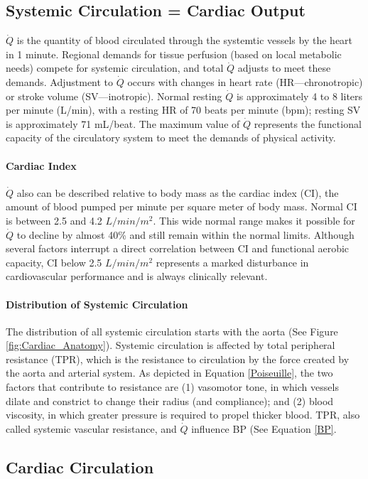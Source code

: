 \subsection{Systemic Circulation = Cardiac Output}
$\dot{Q}$ is the quantity of blood circulated through the systemtic vessels by the heart in 1 minute. Regional demands for tissue perfusion (based on local metabolic needs) compete for systemic circulation, and total $\dot{Q}$ adjusts to meet these demands. Adjustment to $\dot{Q}$ occurs with changes in heart rate (HR—chronotropic) or stroke volume (SV—inotropic). Normal resting $\dot{Q}$ is approximately 4 to 8 liters per minute (L/min), with a resting HR of 70 beats per minute (bpm); resting SV is approximately 71 mL/beat. The maximum value of $\dot{Q}$ represents the functional capacity of the circulatory system to meet the demands of physical activity.

\paragraph{Cardiac Index}
$\dot{Q}$ also can be described relative to body mass as the cardiac index (CI), the amount of blood pumped per minute per square meter of body mass. Normal CI is between 2.5 and 4.2 $L/min/m^2$. This wide normal range makes it possible for $\dot{Q}$ to decline by almost 40\% and still remain within the normal limits. Although several factors interrupt a direct correlation between CI and functional aerobic capacity,  CI below 2.5 $L/min/m^2$ represents a marked disturbance in cardiovascular performance and is always clinically relevant.

\paragraph{Distribution of Systemic Circulation}
The distribution of all systemic circulation starts with the aorta (See Figure \ref{fig:Cardiac_Anatomy}). Systemic circulation is affected by total peripheral resistance (TPR), which is the resistance to circulation by the force created by the aorta and arterial system. As depicted in Equation \ref{Poiseuille}, the two factors that contribute to resistance are (1) vasomotor tone, in which vessels dilate and constrict to change their radius (and compliance); and (2) blood viscosity, in which greater pressure is required to propel thicker blood. TPR, also called systemic vascular resistance, and $\dot{Q}$ influence BP (See Equation \ref{BP}. 

\subsection{Cardiac Circulation}

